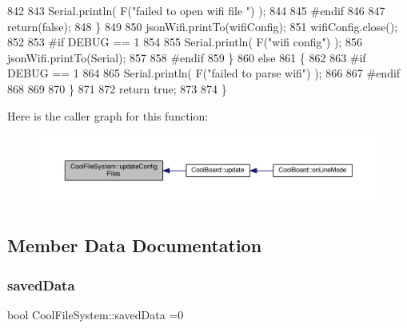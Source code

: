 \begin{DoxyCode}
842 
843             Serial.println( F(\textcolor{stringliteral}{"failed to open wifi file "}) );
844         
845 \textcolor{preprocessor}{        #endif}
846         
847             \textcolor{keywordflow}{return}(\textcolor{keyword}{false});
848         \}
849 
850         jsonWifi.printTo(wifiConfig);
851         wifiConfig.close();
852 
853 \textcolor{preprocessor}{#if DEBUG == 1 }
854 
855         Serial.println( F(\textcolor{stringliteral}{"wifi config"}) );
856         jsonWifi.printTo(Serial);
857 
858 \textcolor{preprocessor}{#endif}
859     \}
860     \textcolor{keywordflow}{else}
861     \{
862 
863 \textcolor{preprocessor}{    #if DEBUG == 1 }
864 
865         Serial.println( F(\textcolor{stringliteral}{"failed to parse wifi"}) );
866     
867 \textcolor{preprocessor}{    #endif}
868 
869     
870     \}   
871         
872     \textcolor{keywordflow}{return} \textcolor{keyword}{true};
873 
874 \}   
\end{DoxyCode}
Here is the caller graph for this function\+:\nopagebreak
\begin{figure}[H]
\begin{center}
\leavevmode
\includegraphics[width=350pt]{classCoolFileSystem_adfa8e2e80641ae6f0cceabd348a9b841_icgraph}
\end{center}
\end{figure}


\subsection{Member Data Documentation}
\mbox{\label{classCoolFileSystem_ad398e0c5c41a0c88acdf5d672aa71351}} 
\subsubsection{\texorpdfstring{saved\+Data}{savedData}}
{\footnotesize\ttfamily bool Cool\+File\+System\+::saved\+Data =0\hspace{0.3cm}{\ttfamily [private]}}



